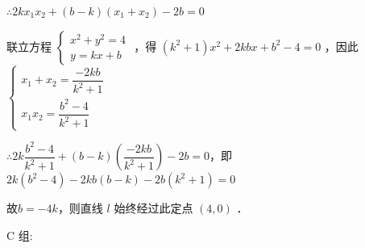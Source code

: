 \begin{enumerate}
\begin{jieda}
\begin{enumerate}
            $\therefore 2 k x_1 x_2+(b-k)\left(x_1+x_2\right)-2 b=0$
            
            
            联立方程 $\left\{\begin{array}{l}x^2+y^2=4 \\ y=k x+b\end{array}\right.$ ，得 $\left(k^2+1\right) x^2+2 k b x+b^2-4=0$ ，因此$\left\{\begin{array}{l}
                 x_1+x_2=\dfrac{-2 k b}{k^2+1} \\
                 x_1 x_2=\dfrac{b^2-4}{k^2+1}
            \end{array}\right.$

            $\therefore 2 k \dfrac{b^2-4}{k^2+1}+(b-k)\left(\dfrac{-2 k b}{k^2+1}\right)-2 b=0$，即$2 k\left(b^2-4\right)-2 k b(b-k)-2 b\left(k^2+1\right)=0$

            故$b = -4k$，则直线 $l$ 始终经过此定点 $(4,0)$ ．
            
        \end{enumerate}
    \end{jieda}
    
\end{enumerate}



C 组:

